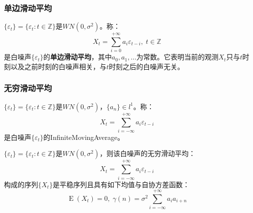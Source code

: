 \subsubsection{单边滑动平均}
\begin{definition}
	$\{\varepsilon_t\}=\{\varepsilon_t:t\in\mathbb{Z}\}$是$WN(0,\sigma^2)$。称：
	\begin{equation*}
		X_t=\sum_{i=0}^{+\infty}a_i\varepsilon_{t-i},\;t\in\mathbb{Z}
	\end{equation*}
	是白噪声$\{\varepsilon_t\}$的\textbf{单边滑动平均}，其中$a_0,a_1,\dots$为常数。它表明当前的观测$X_t$只与$t$时刻以及之前时刻的白噪声相关，与$t$时刻之后的白噪声无关。
\end{definition}
\subsubsection{无穷滑动平均}
\begin{definition}
	$\{\varepsilon_t\}=\{\varepsilon_t:t\in\mathbb{Z}\}$是$WN(0,\sigma^2)$，$\{a_n\}\in l^1$。称：
	\begin{equation*}
		X_t=\sum_{i=-\infty}^{+\infty}a_i\varepsilon_{t-i}
	\end{equation*}
	是白噪声$\{\varepsilon_t\}$的\gls{InfiniteMovingAverage}。
\end{definition}
\begin{theorem}\label{theo:l1LinearlyStationarySeries}
	$\{\varepsilon_t\}=\{\varepsilon_t:t\in\mathbb{Z}\}$是$WN(0,\sigma^2)$，则该白噪声的无穷滑动平均：
	\begin{equation*}
		X_t=\sum_{i=-\infty}^{+\infty}a_i\varepsilon_{t-i}
	\end{equation*}
	构成的序列$\{X_t\}$是平稳序列且具有如下均值与自协方差函数：
	\begin{equation*}
		\operatorname{E}(X_t)=0,\;\gamma(n)=\sigma^2\sum_{i=-\infty}^{+\infty}a_ia_{i+n}
	\end{equation*}
\end{theorem}
